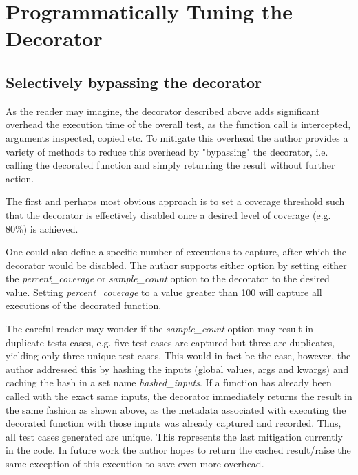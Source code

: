 

\section{Programmatically Tuning the Decorator}\label{sec:decorator tuning}

\subsection{Selectively bypassing the decorator}\label{sec:tuning-1}

As the reader may imagine, the decorator described above adds significant overhead 
the execution time of the overall test, as the function call is intercepted,
arguments inspected, copied etc.  To mitigate this overhead the author provides 
a variety of methods to 
reduce this overhead by "bypassing" the decorator, i.e. calling the decorated 
function and simply returning the result without further action.

The first and perhaps most obvious approach is to set a coverage threshold such 
that the decorator is effectively disabled once a desired level of coverage 
(e.g. 80\%) is achieved. 

One could also define a specific number 
of executions to capture, after which the decorator would be disabled. 
The author supports either option by setting either the \textit{percent\_coverage} or 
\textit{sample\_count} option to the decorator to the desired value.  Setting 
\textit{percent\_coverage} to a value greater than 100 will capture all 
executions of the decorated function.


The careful reader may wonder if the \textit{sample\_count} option may result in 
duplicate tests cases, e.g. five test cases are captured but three are duplicates, 
yielding only three unique test cases.  This would in fact be the case, however, the author 
addressed this by hashing the inputs (global values, args and kwargs) and 
caching the hash in a set name \textit{hashed\_inputs}.  If a function has
already been called with the exact same inputs, the decorator immediately returns
the result in the same fashion as shown above, as the metadata associated with
 executing the decorated function
with those inputs was already captured and recorded.  Thus, all test cases 
generated are unique.  This represents the last mitigation
currently in the code.  In future work the author hopes to return the cached 
result/raise the same exception of this execution to save even more overhead.  

